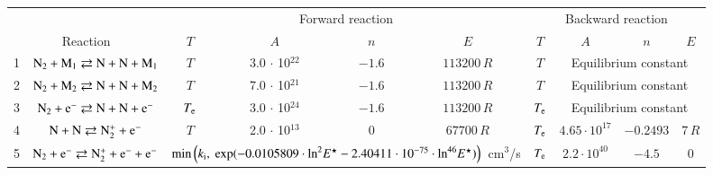 \documentclass{warpdoc}
\renewcommand{\fontsizetable}{\footnotesize\scalefont{0.9}}
\begin{document}
%
\begin{table}[t]
\fontsizetable
\begin{center}
\begin{threeparttable}
\begin{tabular}{cccccccccc} 
\toprule
~&~&\multicolumn{4}{c}{Forward reaction} & \multicolumn{4}{c}{Backward reaction} \\
 \cmidrule(lr){3-6}\cmidrule(lr){7-10}
\multicolumn{2}{c}{Reaction} & $T$ & $A$ & $n$ & $E$ & $T$  & $A$ & $n$ & $E$ \\ 
\midrule
1 & $\rm N_2 + M_1 \rightleftarrows N + N + M_1$ & $T$   & 3.0 $\cdot$ 10$^{22}$  & $-1.6$ & $113200 \, R$  & $T$ &\multicolumn{3}{c}{Equilibrium constant} \\

2 & $\rm N_2 + M_2 \rightleftarrows N + N + M_2$ & $T$  & 7.0 $\cdot$ 10$^{21}$  & $-1.6$ & $113200 \, R$ & $T$ & \multicolumn{3}{c}{Equilibrium constant}  \\

3 & $\rm N_2 + e^- \rightleftarrows N + N + e^-$ & $T_{\rm e}$ & 3.0 $\cdot$ 10$^{24}$  & $-1.6$ & $113200 \, R$ & $T_{\rm e}$ & \multicolumn{3}{c}{Equilibrium constant} \\


4 & $\rm N + N \rightleftarrows N_2^+ + e^- $ & $T$ & 2.0 $\cdot$ 10$^{13}$  & 0 & $67700 \, R$ & $T_{\rm e}$ &  $4.65 \cdot 10^{17}$ & $-0.2493$ & $7\, R$ \\


5 & $\rm N_2 + e^- \rightleftarrows N_2^+ + e^- + e^-$ &\multicolumn{4}{c}{$\min\left(k_{\rm i},~{\rm exp}(-0.0105809\cdot {\rm ln}^2 E^\star - 2.40411\cdot 10^{-75} \cdot {\rm ln}^{46}E^\star)\right)$~cm$^3$/s} 
                                          &$T_{\rm e}$ & $2.2 \cdot 10^{40}$  & $-4.5$  & 0\\


\end{tabular}
\end{threeparttable}
\end{center}
\end{table}
\end{document}
